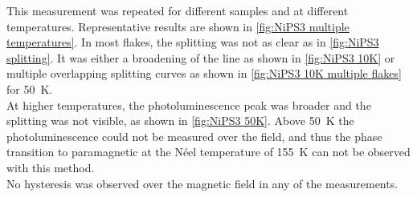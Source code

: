 \documentclass[
	twoside,
	parskip=half,
	a4paper,
]{scrbook}
\begin{document}
This measurement was repeated for different samples and at different temperatures.
Representative results are shown in \autoref{fig:NiPS3 multiple temperatures}.
In most flakes, the splitting was not as clear as in \autoref{fig:NiPS3 splitting}.
It was either a broadening of the line as shown in \autoref{fig:NiPS3 10K} or multiple overlapping splitting curves as shown in \autoref{fig:NiPS3 10K multiple flakes} for \SI{50}{K}.\\
At higher temperatures, the photoluminescence peak was broader and the splitting was not visible, as shown in \autoref{fig:NiPS3 50K}.
Above \SI{50}{K} the photoluminescence could not be measured over the field, and thus the phase transition to paramagnetic at the Néel temperature of \SI{155}{K} \cite{MPS_magnetism} can not be observed with this method.\\
No hysteresis was observed over the magnetic field in any of the measurements.

\clearpage
\end{document}
